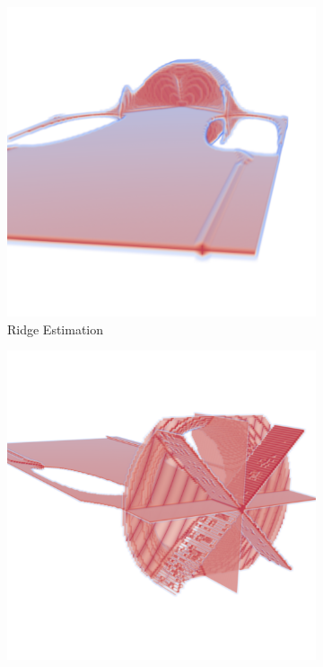 \begin{figure}[]
    \begin{subfigure}{0.49\textwidth}
        \includegraphics[trim= 0 200 0 200, clip=true, width=\textwidth]{Images/isoRE.png}
        \caption{Ridge Estimation}
        \label{fig:isoRE}
    \end{subfigure}
    \begin{subfigure}{0.49\textwidth}
        \includegraphics[trim= 0 200 0 200, clip=true, width=\textwidth]{Images/isoUMC.png}

\end{subfigure}
\end{figure}
